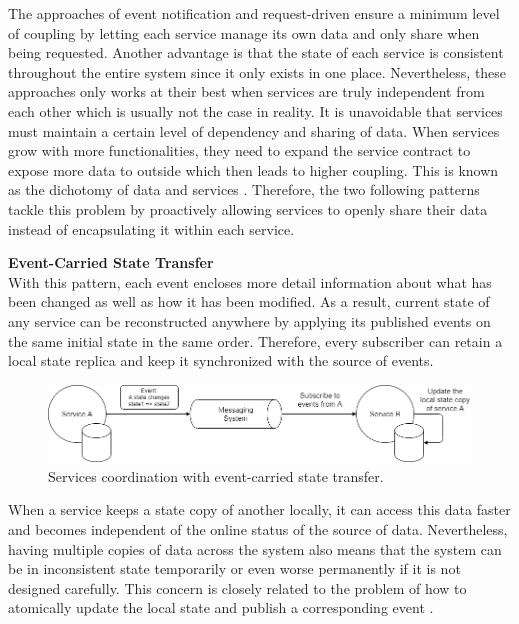 The approaches of event notification and request-driven ensure a minimum level of coupling by letting each service manage its own data and only share when being requested. Another advantage is that the state of each service is consistent throughout the entire system since it only exists in one place. Nevertheless, these approaches only works at their best when services are truly independent from each other which is usually not the case in reality. It is unavoidable that services must maintain a certain level of dependency and sharing of data. When services grow with more functionalities, they need to expand the service contract to expose more data to outside which then leads to higher coupling. This is known as the dichotomy of data and services \cite{stopford2018designing}. Therefore, the two following patterns tackle this problem by proactively allowing services to openly share their data instead of encapsulating it within each service.

\textbf{Event-Carried State Transfer}\\
With this pattern, each event encloses more detail information about what has been changed as well as how it has been modified. As a result, current state of any service can be reconstructed anywhere by applying its published events on the same initial state in the same order. Therefore, every subscriber can retain a local state replica and keep it synchronized with the source of events.

\begin{figure}[h]
	\includegraphics[width=\linewidth]{images/eventstatetransfer.png}
	\caption{Services coordination with event-carried state transfer.}
	\label{fig:eventstatetransfer}
\end{figure}

When a service keeps a state copy of another locally, it can access this data faster and becomes independent of the online status of the source of data. Nevertheless, having multiple copies of data across the system also means that the system can be in inconsistent state temporarily or even worse permanently if it is not designed carefully. This concern is closely related to the problem of how to atomically update the local state and publish a corresponding event \cite{eventstatetransferproblem}.

